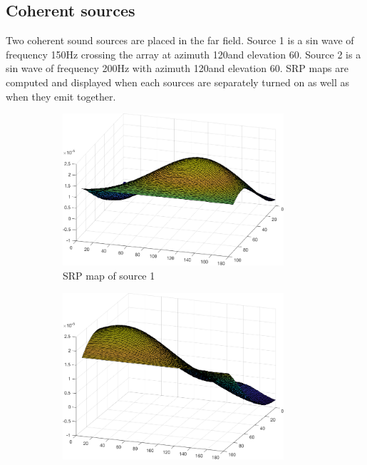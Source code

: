 \subsection{Coherent sources}

Two coherent sound sources are placed in the far field. Source 1 is a sin wave of frequency 150Hz crossing the array at azimuth 120\degree and elevation 60\degree. Source 2 is a sin wave of frequency 200Hz with azimuth 120\degree and elevation 60\degree. SRP maps are computed and displayed when each sources are separately turned on as well as when they emit together.
\begin{figure}[H]
    \centering
    \begin{subfigure}[b]{0.7\textwidth}
    \centering
    \includegraphics[width=0.9\textwidth]{Figures/source1_200hz.png}
    \caption{SRP map of source 1}
    \label{fig:s1_200hz}
\end{subfigure}
\hfill
\begin{subfigure}[b]{0.7\textwidth}
    \centering
    \includegraphics[width=0.9\textwidth]{Figures/source2_150hz.png}

\end{subfigure}
\end{figure}
